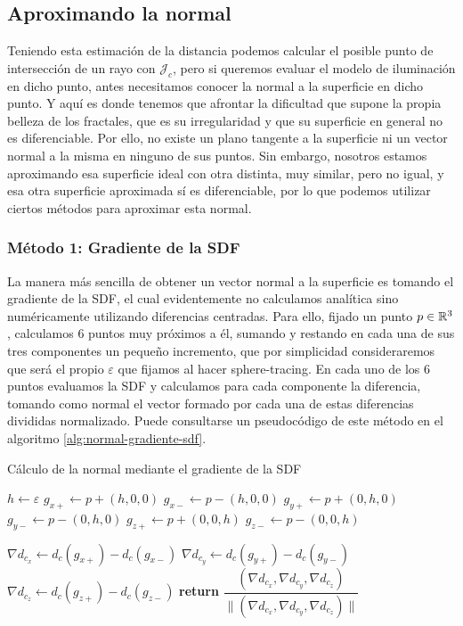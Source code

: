 \subsection{Aproximando la normal}
\label{subsection:normal-sdf}

Teniendo esta estimación de la distancia podemos calcular el posible punto de intersección de un rayo con $\mathcal{J}_c$, pero si queremos evaluar el modelo de iluminación en dicho punto, antes necesitamos conocer la normal a la superficie en dicho punto. Y aquí es donde tenemos que afrontar la dificultad que supone la propia belleza de los fractales, que es su irregularidad y que su superficie en general no es diferenciable. Por ello, no existe un plano tangente a la superficie ni un vector normal a la misma en ninguno de sus puntos. Sin embargo, nosotros estamos aproximando esa superficie ideal con otra distinta, muy similar, pero no igual, y esa otra superficie aproximada sí es diferenciable, por lo que podemos utilizar ciertos métodos para aproximar esta normal.

\subsubsection{Método 1: Gradiente de la SDF}

La manera más sencilla de obtener un vector normal a la superficie es tomando el gradiente de la SDF, el cual evidentemente no calculamos analítica sino numéricamente utilizando diferencias centradas. Para ello, fijado un punto $p\in\mathbb{R}^3$, calculamos 6 puntos muy próximos a él, sumando y restando en cada una de sus tres componentes un pequeño incremento, que por simplicidad consideraremos que será el propio $\varepsilon$ que fijamos al hacer sphere-tracing. En cada uno de los 6 puntos evaluamos la SDF y calculamos para cada componente la diferencia, tomando como normal el vector formado por cada una de estas diferencias divididas normalizado. Puede consultarse un pseudocódigo de este método en el algoritmo \ref{alg:normal-gradiente-sdf}.

\begin{algorithm}[!]
    \caption{Cálculo de la normal mediante el gradiente de la SDF} \label{alg:normal-gradiente-sdf}
    \begin{algorithmic}
        \State $h\gets\varepsilon$
        \State $g_{x+}\gets p + (h,0,0)$
        \State $g_{x-}\gets p - (h,0,0)$
        \State $g_{y+}\gets p + (0,h,0)$
        \State $g_{y-}\gets p - (0,h,0)$
        \State $g_{z+}\gets p + (0,0,h)$
        \State $g_{z-}\gets p - (0,0,h)$

        \State $\nabla d_{c_x} \gets d_c(g_{x+})-d_c(g_{x-})$
        \State $\nabla d_{c_y} \gets d_c(g_{y+})-d_c(g_{y-})$
        \State $\nabla d_{c_z} \gets d_c(g_{z+})-d_c(g_{z-})$
            \State \textbf{return} $\dfrac{(\nabla d_{c_x},\nabla d_{c_y},\nabla d_{c_z})}{\|(\nabla d_{c_x},\nabla d_{c_y},\nabla d_{c_z})\|}$
    \EndProcedure
    \end{algorithmic}
\end{algorithm}

